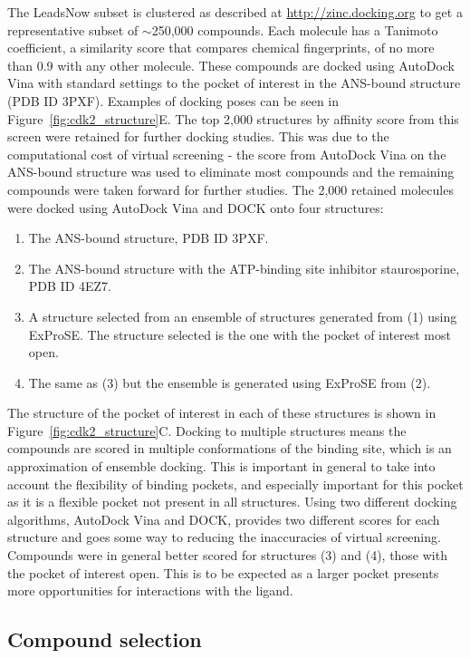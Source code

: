 The LeadsNow subset is clustered as described at \url{http://zinc.docking.org} to get a representative subset of $\sim$250,000 compounds.
Each molecule has a Tanimoto coefficient, a similarity score that compares chemical fingerprints, of no more than 0.9 with any other molecule.
These compounds are docked using AutoDock Vina \cite{Trott2010} with standard settings to the pocket of interest in the ANS-bound structure (PDB ID 3PXF).
Examples of docking poses can be seen in Figure~\ref{fig:cdk2_structure}E.
The top 2,000 structures by affinity score from this screen were retained for further docking studies.
This was due to the computational cost of virtual screening - the score from AutoDock Vina on the ANS-bound structure was used to eliminate most compounds and the remaining compounds were taken forward for further studies.
The 2,000 retained molecules were docked using AutoDock Vina and DOCK \cite{Allen2015} onto four structures:
\begin{enumerate}
\item The ANS-bound structure, PDB ID 3PXF.
\item The ANS-bound structure with the ATP-binding site inhibitor staurosporine, PDB ID 4EZ7.
\item A structure selected from an ensemble of structures generated from (1) using ExProSE.
The structure selected is the one with the pocket of interest most open.
\item The same as (3) but the ensemble is generated using ExProSE from (2).
\end{enumerate}
The structure of the pocket of interest in each of these structures is shown in Figure~\ref{fig:cdk2_structure}C.
Docking to multiple structures means the compounds are scored in multiple conformations of the binding site, which is an approximation of ensemble docking.
This is important in general to take into account the flexibility of binding pockets, and especially important for this pocket as it is a flexible pocket not present in all structures.
Using two different docking algorithms, AutoDock Vina and DOCK, provides two different scores for each structure and goes some way to reducing the inaccuracies of virtual screening.
Compounds were in general better scored for structures (3) and (4), those with the pocket of interest open.
This is to be expected as a larger pocket presents more opportunities for interactions with the ligand.


\subsection{Compound selection}

